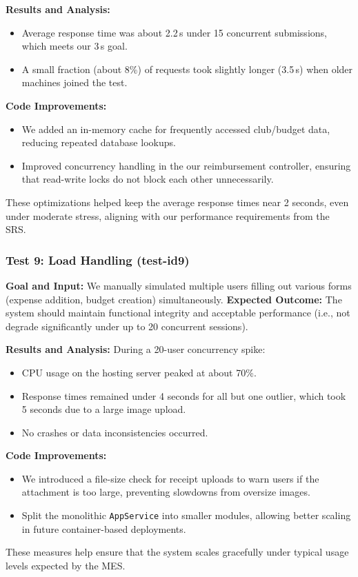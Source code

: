 \documentclass[12pt, titlepage]{article}
\begin{document}
\noindent
\textbf{Results and Analysis:}  
\begin{itemize}
  \item Average response time was about 2.2\,s under 15 concurrent submissions, which meets our 3\,s goal.
  \item A small fraction (about 8\%) of requests took slightly longer (3.5\,s) when older machines joined the test.
\end{itemize}

\noindent
\textbf{Code Improvements:}  
\begin{itemize}
  \item We added an in-memory cache for frequently accessed club/budget data, reducing repeated database lookups.
  \item Improved concurrency handling in the our reimbursement controller, ensuring that read-write locks do not block each other unnecessarily.
\end{itemize}
These optimizations helped keep the average response times near 2 seconds, even under moderate stress, aligning with our performance requirements from the SRS.

\subsubsection{Test 9: Load Handling (test-id9)}

\noindent
\textbf{Goal and Input:}  
We manually simulated multiple users filling out various forms (expense addition, budget creation) simultaneously.  
\textbf{Expected Outcome:} The system should maintain functional integrity and acceptable performance (i.e., not degrade significantly under up to 20 concurrent sessions).

\noindent
\textbf{Results and Analysis:}  
During a 20-user concurrency spike:
\begin{itemize}
  \item CPU usage on the hosting server peaked at about 70\%.  
  \item Response times remained under 4 seconds for all but one outlier, which took 5 seconds due to a large image upload.
  \item No crashes or data inconsistencies occurred.
\end{itemize}

\noindent
\textbf{Code Improvements:}
\begin{itemize}
  \item We introduced a file-size check for receipt uploads to warn users if the attachment is too large, preventing slowdowns from oversize images.
  \item Split the monolithic \texttt{AppService} into smaller modules, allowing better scaling in future container-based deployments.
\end{itemize}
These measures help ensure that the system scales gracefully under typical usage levels expected by the MES.
\end{document}
